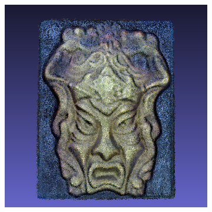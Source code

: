 \documentclass[letterpaper, 10 pt, conference]{ieeeconf}  %
\begin{document}
\begin{figure}[t]
\begin{subfigure}[b]{0.45\linewidth}
                \includegraphics[width=\linewidth]{../models/gorgon_color_model.png}
                \caption{}
        \end{subfigure}


\end{figure}
\end{document}

